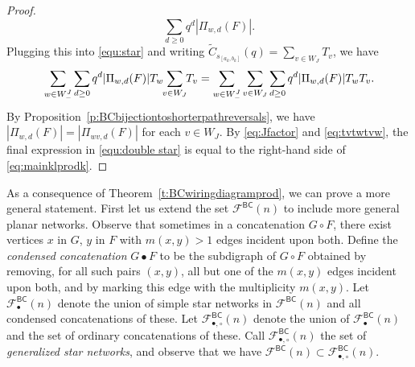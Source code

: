 \documentclass[12pt]{amsart}
\theoremstyle{definition}
\numberwithin{equation}{section}
\newcommand{\Wejm}{W^J_-}
\newcommand{\wtc}[2]{\widetilde{C}_{#1}(#2)}
\newcommand{\ntnsp}{\negthinspace}
\newcommand{\ntksp}{\negthickspace}
\newcommand{\net}[2]{\mathcal F^{\mathsf{#1}}(#2)}
\newcommand{\bnet}[2]{\mathcal F^{\mathsf{#1}}_\bullet(#2)}
\newcommand{\bcnet}[2]{\mathcal F^{\mathsf{#1}}_{\bullet,\circ}(#2)}
\newcommand{\msfBC}{\mathsf{BC}}
\begin{document}
\begin{proof}
\begin{equation*}
\sum_{d\geq 0}q^d|\Pi_{w,d}(F)|.
\end{equation*}
Plugging this into \eqref{equ:star} and writing $\wtc {s_{[a_k,b_k]}}q=\sum_{v\in W_J}T_v$, we have 
\begin{equation}\label{equ:double star}
\begin{aligned}
     \sum_{w \in \Wejm} 
\sum_{d\geq 0}q^d|\Pi_{w,d}(F)|T_w \ntksp \sum_{v\in W_J}\ntksp T_v
 = \sum_{w\in\Wejm} \sum_{v\in W_J}\sum_{d\geq 0}q^d|\Pi_{w,d}(F)|T_w T_v.
\end{aligned}
\end{equation}
By Proposition~\ref{p:BCbijectiontoshorterpathreversals}, we have $|\Pi_{w,d}(F)|=|\Pi_{wv,d}(F)|$ for each $v\in W_J$. By \eqref{eq:Jfactor} and \eqref{eq:tvtwtvw},
the final expression in \eqref{equ:double star} is equal to the right-hand side of \eqref{eq:mainklprodk}.
\end{proof}
As a consequence of Theorem~\ref{t:BCwiringdiagramprod}, we can prove a more general statement.  
First let us extend the set $\net\msfBC n$ to include more general planar networks.
Observe that sometimes in a
concatenation $G \circ F$, there exist vertices $x$ in $G$, $y$ in $F$ with $m(x,y) > 1$ 
edges incident upon both. Define the {\em condensed concatenation} $G \bullet F$ to be the subdigraph
of $G \circ F$ obtained by removing, for all such pairs $(x,y)$, all but one of the $m(x,y)$ edges
incident upon both, and by marking this edge with the multiplicity $m(x,y)$.
Let $\bnet{\msfBC}n$ denote
the union of simple star networks in $\net{\msfBC}n$ and all condensed concatenations of these. Let $\bcnet{\msfBC}n$ denote
the union of $\bnet{\msfBC}n$ and the set of ordinary concatenations of these. Call $\bcnet{\msfBC}n$ the set of {\em generalized star networks}, and observe that we have $\net{\msfBC}n \subset \bcnet{\msfBC}n$.
\end{document}
